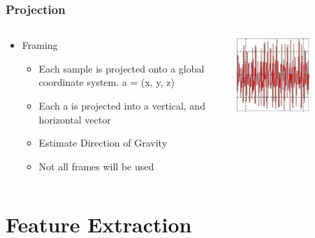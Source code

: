 \documentclass{beamer}
\begin{document}
\begin{frame}
  \frametitle{Projection}
  \begin{columns}
  \begin{column}{.6\textwidth}
  \begin{itemize}
  	\item Framing
  	\begin{itemize}
  		\item Each sample is projected onto a global coordinate system. a = (x, y, z)
  		\linebreak
  		\item  Each a is projected into a vertical, and horizontal vector
  		\linebreak
  		\item Estimate Direction of Gravity
  		\linebreak
  		\item Not all frames will be used 
  	\end{itemize}
  \end{itemize}
  \end{column}
  \begin{column}{0.6\textwidth}
   \includegraphics[width=0.6\textwidth]{Illustrations/rawgaitdata.png}
       \\
  \end{column}
  \end{columns}
\end{frame}




\section[Gait Extraction]{Feature Extraction}
\end{document}

